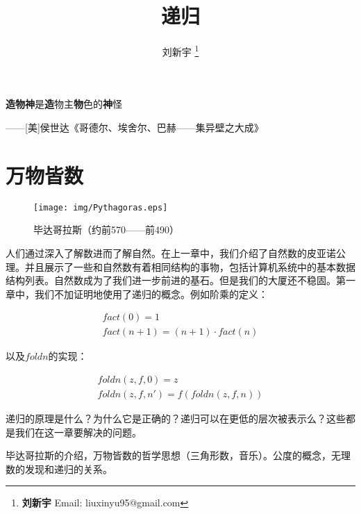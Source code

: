 \documentclass[UTF8]{article}
\begin{document}
\title{递归}

\author{刘新宇
\thanks{{\bfseries 刘新宇} \newline
  Email: liuxinyu95@gmail.com \newline}
  }

\maketitle
\fi


\epigraph{\textbf{造物神}是\textbf{造}物主\textbf{物}色的\textbf{神}怪}{——[美]侯世达《哥德尔、埃舍尔、巴赫——集异壁之大成》}

\section{万物皆数}

\begin{wrapfigure}{R}{0.3\textwidth}
 \centering
 \texttt{[image: img/Pythagoras.eps]}
 \captionsetup{labelformat=empty}
 \caption{毕达哥拉斯（约前570——前490）}
 \label{fig:Pythagoras}
\end{wrapfigure}

人们通过深入了解数进而了解自然。在上一章中，我们介绍了自然数的皮亚诺公理。并且展示了一些和自然数有着相同结构的事物，包括计算机系统中的基本数据结构列表。自然数成为了我们进一步前进的基石。但是我们的大厦还不稳固。第一章中，我们不加证明地使用了递归的概念。例如阶乘的定义：

\[
\begin{array}{l}
fact(0) = 1 \\
fact(n + 1) = (n + 1) \cdot fact(n)
\end{array}
\]

以及$foldn$的实现：

\[
\begin{array}{l}
foldn(z, f, 0) = z \\
foldn(z, f, n') = f(foldn(z, f, n))
\end{array}
\label{eq:foldn}
\]

递归的原理是什么？为什么它是正确的？递归可以在更低的层次被表示么？这些都是我们在这一章要解决的问题。

毕达哥拉斯的介绍，万物皆数的哲学思想（三角形数，音乐）。公度的概念，无理数的发现和递归的关系。


\end{document}
